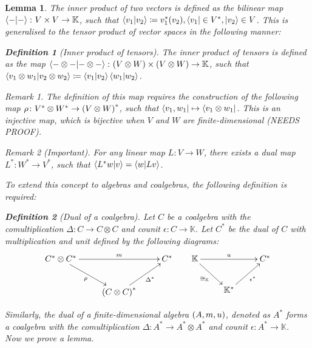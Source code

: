 \documentclass{article}
\newtheorem{Lemma}{Lemma}
\theoremstyle{definition}
\newtheorem{Definition}{Definition}
\theoremstyle{remark}
\newtheorem*{Remark*}{Remark}
\theoremstyle{underline}
\theoremstyle{underline}
\begin{document}
\begin{Lemma}
	The inner product of two vectors is defined as the bilinear map $\braket{-}{-}\colon V \times V \to \mathbb K$, such that $\braket{v_1}{v_2} \coloneqq v_1^*(v_2), \bra{v_1} \in V^*, \ket{v_2} \in V$. This is generalised to the tensor product of vector spaces in the following manner:

	\begin{Definition}[Inner product of tensors]
		The \emph{inner product of tensors} is defined as the map $\braket{- \otimes -}{- \otimes -}\colon \pqty{V \otimes W} \times \pqty{V \otimes W} \to \mathbb K$, such that $ \braket{v_1 \otimes w_1}{v_2 \otimes w_2} \coloneqq \braket{v_1}{v_2}\braket{w_1}{w_2}$.
	\end{Definition} 

	\begin{Remark*}
		The definition of this map requires the construction of the following map $\rho\colon {V^* \otimes W^*} \to \pqty{V \otimes W}^*$, such that $\bra{v_1, w_1} \mapsto \bra{v_1 \otimes w_1}$. This is an injective map, which is bijective when $V$ and $W$ are finite-dimensional (NEEDS PROOF).
 	\end{Remark*}

 	\begin{Remark*}[\emph{Important}]
 		For any linear map $L\colon V \to W$, there exists a dual map $L^*\colon W^* \to V^*$, such that $\braket{L^*w}{v} = \braket{w}{Lv}$.
 	\end{Remark*}

 	To extend this concept to algebras and coalgebras, the following definition is required:
 	
 	\begin{Definition}[Dual of a coalgebra]
 		Let $C$ be a coalgebra with the comultiplication $\Delta\colon C \to C \otimes C$ and counit $\epsilon\colon C \to \mathbb K$. Let $C^*$ be the dual of $C$ with multiplication and unit defined by the following diagrams:
 		\begin{equation*}
			\xymatrix{
				C^* \otimes C^* \ar[rr]^-{m} \ar[rd]_-{\rho} & & C^* \\
				& \pqty{C \otimes C}^* \ar[ru]_-{\Delta^*}
			} \;\;\;\;\;\;
			\xymatrix{
				\mathbb K \ar[rr]^-{u} \ar[rd]_-{\cong_{\mathbb K}} & & C^* \\
				& \mathbb K^* \ar[ru]_-{\epsilon^*}
			}
		\end{equation*}
 	\end{Definition}
 	Similarly, the dual of a \emph{finite-dimensional} algebra $\pqty{A, m, u}$, denoted as $A^*$ forms a coalgebra with the comultiplication $\Delta\colon A^* \to A^* \otimes A^*$ and counit $\epsilon\colon A^* \to \mathbb K$. \\
 	Now we prove a lemma.


\end{Lemma}
\end{document}
